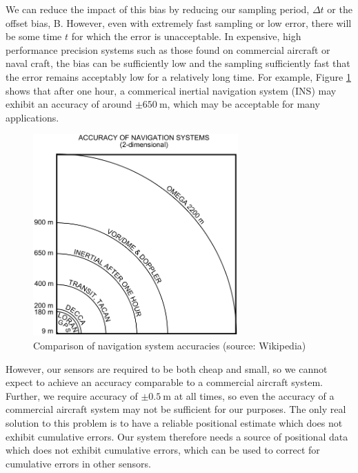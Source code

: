 \documentclass[capstone_report.tex]{subfiles}
\begin{document}
We can reduce the impact of this bias by reducing our sampling period, $\Delta t$ or the offset bias, B. However, even with extremely fast sampling or low error, there will be some time $t$ for which the error is unacceptable. In expensive, high performance precision systems such as those found on commercial aircraft or naval craft, the bias can be sufficiently low and the sampling sufficiently fast that the error remains acceptably low for a relatively long time. For example, Figure \ref{fig:inAcc} shows that after one hour, a commerical inertial navigation system (INS) may exhibit an accuracy of around $\pm \SI{650}{\meter}$, which may be acceptable for many applications.\\

\begin{figure}[H]
    \centering
    \includegraphics[width=0.7\textwidth]{imgs/inertialAcc.png}
    \caption{Comparison of navigation system accuracies (source: Wikipedia)\label{fig:inAcc}}
\end{figure}

However, our sensors are required to be both cheap and small, so we cannot expect to achieve an accuracy comparable to a commercial aircraft system. Further, we require accuracy of $\pm \SI{0.5}{\meter}$ at all times, so even the accuracy of a commercial aircraft system may not be sufficient for our purposes. The only real solution to this problem is to have a reliable positional estimate which does not exhibit cumulative errors. Our system therefore needs a source of positional data which does not exhibit cumulative errors, which can be used to correct for cumulative errors in other sensors. \\
\end{document}
